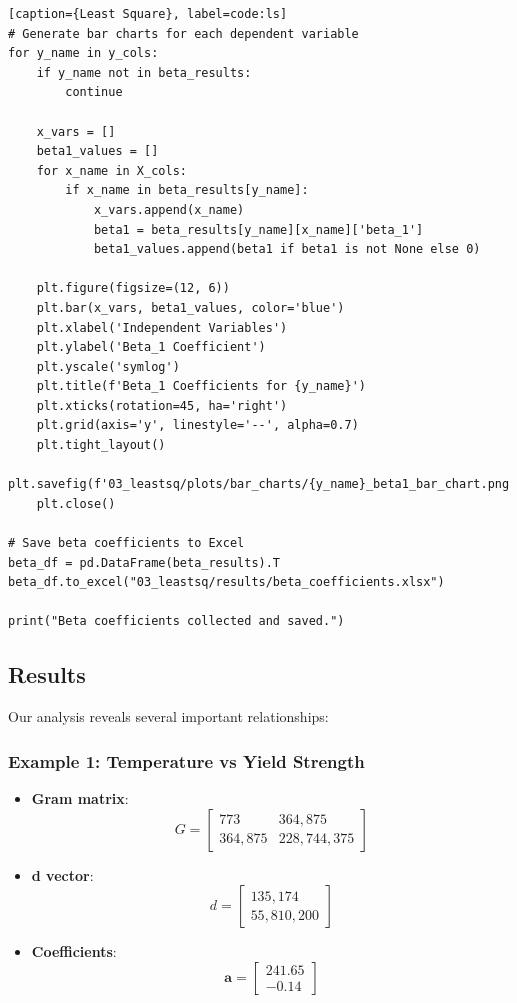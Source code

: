 \documentclass[10pt]{article}
\begin{document}
\begin{lstlisting}[style=custompython][caption={Least Square}, label=code:ls]
# Generate bar charts for each dependent variable
for y_name in y_cols:
    if y_name not in beta_results:
        continue

    x_vars = []
    beta1_values = []
    for x_name in X_cols:
        if x_name in beta_results[y_name]:
            x_vars.append(x_name)
            beta1 = beta_results[y_name][x_name]['beta_1']
            beta1_values.append(beta1 if beta1 is not None else 0)

    plt.figure(figsize=(12, 6))
    plt.bar(x_vars, beta1_values, color='blue')
    plt.xlabel('Independent Variables')
    plt.ylabel('Beta_1 Coefficient')
    plt.yscale('symlog')
    plt.title(f'Beta_1 Coefficients for {y_name}')
    plt.xticks(rotation=45, ha='right')
    plt.grid(axis='y', linestyle='--', alpha=0.7)
    plt.tight_layout()
    plt.savefig(f'03_leastsq/plots/bar_charts/{y_name}_beta1_bar_chart.png')
    plt.close()

# Save beta coefficients to Excel
beta_df = pd.DataFrame(beta_results).T
beta_df.to_excel("03_leastsq/results/beta_coefficients.xlsx")

print("Beta coefficients collected and saved.")
\end{lstlisting}

\newpage
\subsection{Results}
Our analysis reveals several important relationships:
\subsubsection{Example 1: Temperature vs Yield Strength}
\begin{itemize}
    \item \textbf{Gram matrix}:
    \[
    G = \begin{bmatrix}
    773 & 364,875 \\
    364,875 & 228,744,375
    \end{bmatrix}
    \]
    \item \textbf{d vector}:
    \[
    d = \begin{bmatrix}
    135,174 \\
    55,810,200
    \end{bmatrix}
    \]
    \item \textbf{Coefficients}:
    \[
    \mathbf{a} = \begin{bmatrix}
    241.65 \\
    -0.14
    \end{bmatrix}
    \]
\end{itemize}
\end{document}
